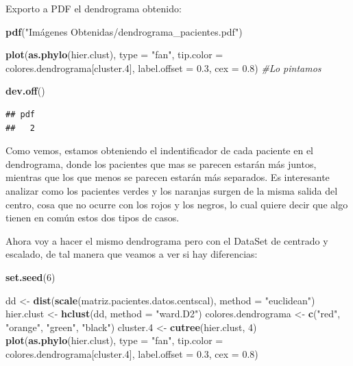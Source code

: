 \documentclass[]{article}
\newenvironment{Shaded}{\begin{snugshade}}{\end{snugshade}}
\newcommand{\KeywordTok}[1]{\textcolor[rgb]{0.13,0.29,0.53}{\textbf{#1}}}
\newcommand{\DataTypeTok}[1]{\textcolor[rgb]{0.13,0.29,0.53}{#1}}
\newcommand{\DecValTok}[1]{\textcolor[rgb]{0.00,0.00,0.81}{#1}}
\newcommand{\FloatTok}[1]{\textcolor[rgb]{0.00,0.00,0.81}{#1}}
\newcommand{\StringTok}[1]{\textcolor[rgb]{0.31,0.60,0.02}{#1}}
\newcommand{\CommentTok}[1]{\textcolor[rgb]{0.56,0.35,0.01}{\textit{#1}}}
\newcommand{\NormalTok}[1]{#1}
\begin{document}
Exporto a PDF el dendrograma obtenido:

\begin{Shaded}
\begin{Highlighting}[]
\KeywordTok{pdf}\NormalTok{(}\StringTok{"Imágenes Obtenidas/dendrograma_pacientes.pdf"}\NormalTok{)}

\KeywordTok{plot}\NormalTok{(}\KeywordTok{as.phylo}\NormalTok{(hier.clust), }\DataTypeTok{type =} \StringTok{"fan"}\NormalTok{, }\DataTypeTok{tip.color =}\NormalTok{ colores.dendrograma[cluster.}\DecValTok{4}\NormalTok{], }\DataTypeTok{label.offset =} \FloatTok{0.3}\NormalTok{, }\DataTypeTok{cex =} \FloatTok{0.8}\NormalTok{) }\CommentTok{#Lo pintamos}

\KeywordTok{dev.off}\NormalTok{()}
\end{Highlighting}
\end{Shaded}

\begin{verbatim}
## pdf 
##   2
\end{verbatim}

Como vemos, estamos obteniendo el indentificador de cada paciente en el
dendrograma, donde los pacientes que mas se parecen estarán más juntos,
mientras que los que menos se parecen estarán más separados. Es
interesante analizar como los pacientes verdes y los naranjas surgen de
la misma salida del centro, cosa que no ocurre con los rojos y los
negros, lo cual quiere decir que algo tienen en común estos dos tipos de
casos.

Ahora voy a hacer el mismo dendrograma pero con el DataSet de centrado y
escalado, de tal manera que veamos a ver si hay diferencias:

\begin{Shaded}
\begin{Highlighting}[]
\KeywordTok{set.seed}\NormalTok{(}\DecValTok{6}\NormalTok{)}

\NormalTok{dd <-}\StringTok{ }\KeywordTok{dist}\NormalTok{(}\KeywordTok{scale}\NormalTok{(matriz.pacientes.datos.centscal), }\DataTypeTok{method =} \StringTok{"euclidean"}\NormalTok{)}
\NormalTok{hier.clust <-}\StringTok{ }\KeywordTok{hclust}\NormalTok{(dd, }\DataTypeTok{method =} \StringTok{"ward.D2"}\NormalTok{)}
\NormalTok{colores.dendrograma <-}\StringTok{ }\KeywordTok{c}\NormalTok{(}\StringTok{"red"}\NormalTok{, }\StringTok{"orange"}\NormalTok{, }\StringTok{"green"}\NormalTok{, }\StringTok{"black"}\NormalTok{)}
\NormalTok{cluster.}\DecValTok{4}\NormalTok{ <-}\StringTok{ }\KeywordTok{cutree}\NormalTok{(hier.clust, }\DecValTok{4}\NormalTok{)}
\KeywordTok{plot}\NormalTok{(}\KeywordTok{as.phylo}\NormalTok{(hier.clust), }\DataTypeTok{type =} \StringTok{"fan"}\NormalTok{, }\DataTypeTok{tip.color =}\NormalTok{ colores.dendrograma[cluster.}\DecValTok{4}\NormalTok{], }\DataTypeTok{label.offset =} \FloatTok{0.3}\NormalTok{, }\DataTypeTok{cex =} \FloatTok{0.8}\NormalTok{)}
\end{Highlighting}
\end{Shaded}
\end{document}
